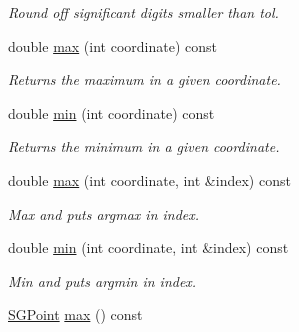 \begin{DoxyCompactItemize}
\begin{DoxyCompactList}\small\item\em Round off significant digits smaller than tol. \end{DoxyCompactList}\item 
\hypertarget{classSGTuple_a616801eebc023c41e305c1cde9dcfccd}{double \hyperlink{classSGTuple_a616801eebc023c41e305c1cde9dcfccd}{max} (int coordinate) const }\label{classSGTuple_a616801eebc023c41e305c1cde9dcfccd}

\begin{DoxyCompactList}\small\item\em Returns the maximum in a given coordinate. \end{DoxyCompactList}\item 
\hypertarget{classSGTuple_ab413ab0a7d009f719b594aef2862f2af}{double \hyperlink{classSGTuple_ab413ab0a7d009f719b594aef2862f2af}{min} (int coordinate) const }\label{classSGTuple_ab413ab0a7d009f719b594aef2862f2af}

\begin{DoxyCompactList}\small\item\em Returns the minimum in a given coordinate. \end{DoxyCompactList}\item 
\hypertarget{classSGTuple_afd396c53203748ca332c4a7fd07e7d57}{double \hyperlink{classSGTuple_afd396c53203748ca332c4a7fd07e7d57}{max} (int coordinate, int \&index) const }\label{classSGTuple_afd396c53203748ca332c4a7fd07e7d57}

\begin{DoxyCompactList}\small\item\em Max and puts argmax in index. \end{DoxyCompactList}\item 
\hypertarget{classSGTuple_a381cbcb4c22c82b472e3c5053ef61c7b}{double \hyperlink{classSGTuple_a381cbcb4c22c82b472e3c5053ef61c7b}{min} (int coordinate, int \&index) const }\label{classSGTuple_a381cbcb4c22c82b472e3c5053ef61c7b}

\begin{DoxyCompactList}\small\item\em Min and puts argmin in index. \end{DoxyCompactList}\item 
\hypertarget{classSGTuple_a92d39c0ac8df09443411c566aa8af1bb}{\hyperlink{classSGPoint}{S\-G\-Point} \hyperlink{classSGTuple_a92d39c0ac8df09443411c566aa8af1bb}{max} () const }\label{classSGTuple_a92d39c0ac8df09443411c566aa8af1bb}


\end{DoxyCompactItemize}
